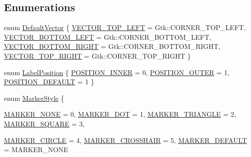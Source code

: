 \subsection*{Enumerations}
\begin{DoxyCompactItemize}
\item 
enum \hyperlink{namespaceGtk_1_1Plot_aa7cadb8fb1ada346afe4e3acce74600d}{DefaultVector} \{ \hyperlink{namespaceGtk_1_1Plot_aa7cadb8fb1ada346afe4e3acce74600da9d3e2fcd8a264bb72f0a74985c3590f0}{VECTOR\_\-TOP\_\-LEFT} =  Gtk::CORNER\_\-TOP\_\-LEFT, 
\hyperlink{namespaceGtk_1_1Plot_aa7cadb8fb1ada346afe4e3acce74600da13009b468d527c2d59db116671bf86c8}{VECTOR\_\-BOTTOM\_\-LEFT} =  Gtk::CORNER\_\-BOTTOM\_\-LEFT, 
\hyperlink{namespaceGtk_1_1Plot_aa7cadb8fb1ada346afe4e3acce74600da065d3f313fe6f3dd4bf0d1c01640cad4}{VECTOR\_\-BOTTOM\_\-RIGHT} =  Gtk::CORNER\_\-BOTTOM\_\-RIGHT, 
\hyperlink{namespaceGtk_1_1Plot_aa7cadb8fb1ada346afe4e3acce74600da7472334ab3130df5927bb5b68f131da3}{VECTOR\_\-TOP\_\-RIGHT} =  Gtk::CORNER\_\-TOP\_\-RIGHT
 \}
\item 
enum \hyperlink{namespaceGtk_1_1Plot_a125746674247df0f29cb6d6aa8089cb6}{LabelPosition} \{ \hyperlink{namespaceGtk_1_1Plot_a125746674247df0f29cb6d6aa8089cb6af6133ad5c0f9a706cf047dc48739c991}{POSITION\_\-INNER} =  0, 
\hyperlink{namespaceGtk_1_1Plot_a125746674247df0f29cb6d6aa8089cb6a848fbccbbfc3d4766f150d90be1e1026}{POSITION\_\-OUTER} =  1, 
\hyperlink{namespaceGtk_1_1Plot_a125746674247df0f29cb6d6aa8089cb6aa5184b4fdfaa911c4a8cf87146df076c}{POSITION\_\-DEFAULT} =  1
 \}
\item 
enum \hyperlink{namespaceGtk_1_1Plot_aa310e5a0b3e79b5d145978cdfdff19f7}{MarkerStyle} \{ \par
\hyperlink{namespaceGtk_1_1Plot_aa310e5a0b3e79b5d145978cdfdff19f7a618d8963f2cb32284cd9584825a0f016}{MARKER\_\-NONE} =  0, 
\hyperlink{namespaceGtk_1_1Plot_aa310e5a0b3e79b5d145978cdfdff19f7a9957a1ee0bda0fc1c63f77ced5fe218d}{MARKER\_\-DOT} =  1, 
\hyperlink{namespaceGtk_1_1Plot_aa310e5a0b3e79b5d145978cdfdff19f7a9679ebd9735aae8ae32369be46fbe529}{MARKER\_\-TRIANGLE} =  2, 
\hyperlink{namespaceGtk_1_1Plot_aa310e5a0b3e79b5d145978cdfdff19f7a2ec925d03c26998ddb10b5388c454e88}{MARKER\_\-SQUARE} =  3, 
\par
\hyperlink{namespaceGtk_1_1Plot_aa310e5a0b3e79b5d145978cdfdff19f7a14412a86fb1eea3b0fa66b4f3496b1f9}{MARKER\_\-CIRCLE} =  4, 
\hyperlink{namespaceGtk_1_1Plot_aa310e5a0b3e79b5d145978cdfdff19f7af0fa8bae0062c6ab61310baac3bc2af1}{MARKER\_\-CROSSHAIR} =  5, 
\hyperlink{namespaceGtk_1_1Plot_aa310e5a0b3e79b5d145978cdfdff19f7a981911cfdb0e03eed0a82b502975c9f0}{MARKER\_\-DEFAULT} =  MARKER\_\-NONE

\end{DoxyCompactItemize}
